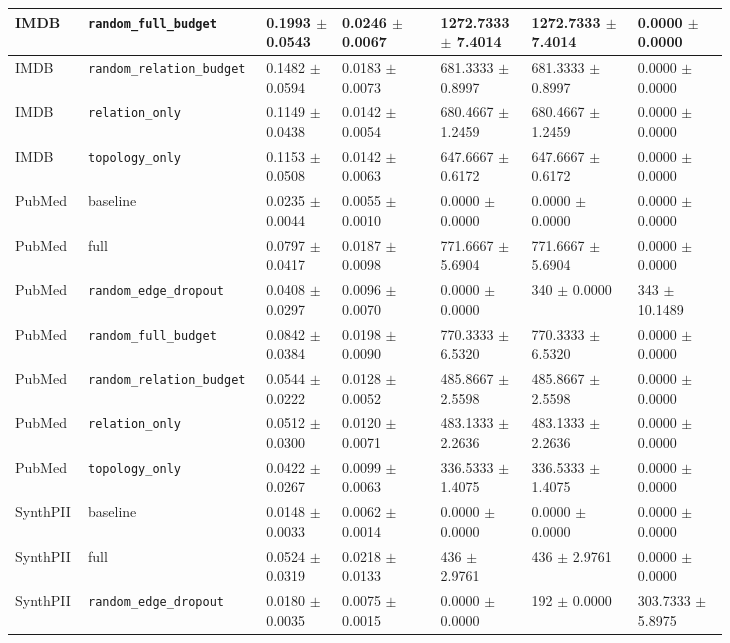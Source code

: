 \documentclass[preprint,12pt]{elsarticle}
\begin{document}
\begin{landscape}
\begin{longtable}{|L{0.07\linewidth}|L{0.15\linewidth}|C{0.10\linewidth}|C{0.13\linewidth}|C{0.12\linewidth}|C{0.14\linewidth}|C{0.12\linewidth}|}
IMDB & \nolinkurl{random_full_budget} & 0.1993 $\pm$ 0.0543 & 0.0246 $\pm$ 0.0067 & 1272.7333 $\pm$ 7.4014 & 1272.7333 $\pm$ 7.4014 & 0.0000 $\pm$ 0.0000 \\ \hline
IMDB & \nolinkurl{random_relation_budget} & 0.1482 $\pm$ 0.0594 & 0.0183 $\pm$ 0.0073 & 681.3333 $\pm$ 0.8997 & 681.3333 $\pm$ 0.8997 & 0.0000 $\pm$ 0.0000 \\ \hline
IMDB & \nolinkurl{relation_only} & 0.1149 $\pm$ 0.0438 & 0.0142 $\pm$ 0.0054 & 680.4667 $\pm$ 1.2459 & 680.4667 $\pm$ 1.2459 & 0.0000 $\pm$ 0.0000 \\ \hline
IMDB & \nolinkurl{topology_only} & 0.1153 $\pm$ 0.0508 & 0.0142 $\pm$ 0.0063 & 647.6667 $\pm$ 0.6172 & 647.6667 $\pm$ 0.6172 & 0.0000 $\pm$ 0.0000 \\ \hline
PubMed & baseline & 0.0235 $\pm$ 0.0044 & 0.0055 $\pm$ 0.0010 & 0.0000 $\pm$ 0.0000 & 0.0000 $\pm$ 0.0000 & 0.0000 $\pm$ 0.0000 \\ \hline
PubMed & full & 0.0797 $\pm$ 0.0417 & 0.0187 $\pm$ 0.0098 & 771.6667 $\pm$ 5.6904 & 771.6667 $\pm$ 5.6904 & 0.0000 $\pm$ 0.0000 \\ \hline
PubMed & \nolinkurl{random_edge_dropout} & 0.0408 $\pm$ 0.0297 & 0.0096 $\pm$ 0.0070 & 0.0000 $\pm$ 0.0000 & 340 $\pm$ 0.0000 & 343 $\pm$ 10.1489 \\ \hline
PubMed & \nolinkurl{random_full_budget} & 0.0842 $\pm$ 0.0384 & 0.0198 $\pm$ 0.0090 & 770.3333 $\pm$ 6.5320 & 770.3333 $\pm$ 6.5320 & 0.0000 $\pm$ 0.0000 \\ \hline
PubMed & \nolinkurl{random_relation_budget} & 0.0544 $\pm$ 0.0222 & 0.0128 $\pm$ 0.0052 & 485.8667 $\pm$ 2.5598 & 485.8667 $\pm$ 2.5598 & 0.0000 $\pm$ 0.0000 \\ \hline
PubMed & \nolinkurl{relation_only} & 0.0512 $\pm$ 0.0300 & 0.0120 $\pm$ 0.0071 & 483.1333 $\pm$ 2.2636 & 483.1333 $\pm$ 2.2636 & 0.0000 $\pm$ 0.0000 \\ \hline
PubMed & \nolinkurl{topology_only} & 0.0422 $\pm$ 0.0267 & 0.0099 $\pm$ 0.0063 & 336.5333 $\pm$ 1.4075 & 336.5333 $\pm$ 1.4075 & 0.0000 $\pm$ 0.0000 \\ \hline
SynthPII & baseline & 0.0148 $\pm$ 0.0033 & 0.0062 $\pm$ 0.0014 & 0.0000 $\pm$ 0.0000 & 0.0000 $\pm$ 0.0000 & 0.0000 $\pm$ 0.0000 \\ \hline
SynthPII & full & 0.0524 $\pm$ 0.0319 & 0.0218 $\pm$ 0.0133 & 436 $\pm$ 2.9761 & 436 $\pm$ 2.9761 & 0.0000 $\pm$ 0.0000 \\ \hline
SynthPII & \nolinkurl{random_edge_dropout} & 0.0180 $\pm$ 0.0035 & 0.0075 $\pm$ 0.0015 & 0.0000 $\pm$ 0.0000 & 192 $\pm$ 0.0000 & 303.7333 $\pm$ 5.8975 \\ \hline

\end{longtable}
\end{landscape}
\end{document}
